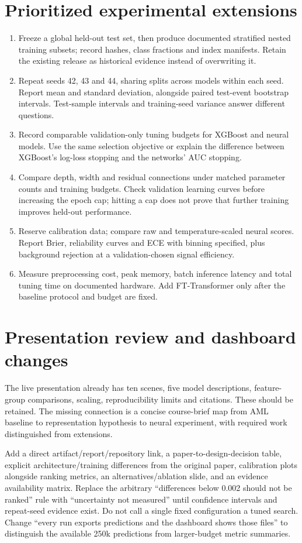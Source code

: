 \documentclass[11pt,a4paper]{article}
\begin{document}
\section{Prioritized experimental extensions}
\begin{enumerate}
\item Freeze a global held-out test set, then produce documented stratified nested training subsets; record hashes, class fractions and index manifests. Retain the existing release as historical evidence instead of overwriting it.
\item Repeat seeds 42, 43 and 44, sharing splits across models within each seed. Report mean and standard deviation, alongside paired test-event bootstrap intervals. Test-sample intervals and training-seed variance answer different questions.
\item Record comparable validation-only tuning budgets for XGBoost and neural models. Use the same selection objective or explain the difference between XGBoost's log-loss stopping and the networks' AUC stopping.
\item Compare depth, width and residual connections under matched parameter counts and training budgets. Check validation learning curves before increasing the epoch cap; hitting a cap does not prove that further training improves held-out performance.
\item Reserve calibration data; compare raw and temperature-scaled neural scores. Report Brier, reliability curves and ECE with binning specified, plus background rejection at a validation-chosen signal efficiency.
\item Measure preprocessing cost, peak memory, batch inference latency and total tuning time on documented hardware. Add FT-Transformer only after the baseline protocol and budget are fixed.
\end{enumerate}

\section{Presentation review and dashboard changes}
The live presentation already has ten scenes, five model descriptions, feature-group comparisons, scaling, reproducibility limits and citations. These should be retained. The missing connection is a concise course-brief map from AML baseline to representation hypothesis to neural experiment, with required work distinguished from extensions.

Add a direct artifact/report/repository link, a paper-to-design-decision table, explicit architecture/training differences from the original paper, calibration plots alongside ranking metrics, an alternatives/ablation slide, and an evidence availability matrix. Replace the arbitrary ``differences below 0.002 should not be ranked'' rule with ``uncertainty not measured'' until confidence intervals and repeat-seed evidence exist. Do not call a single fixed configuration a tuned search. Change ``every run exports predictions and the dashboard shows those files'' to distinguish the available 250k predictions from larger-budget metric summaries.
\end{document}
